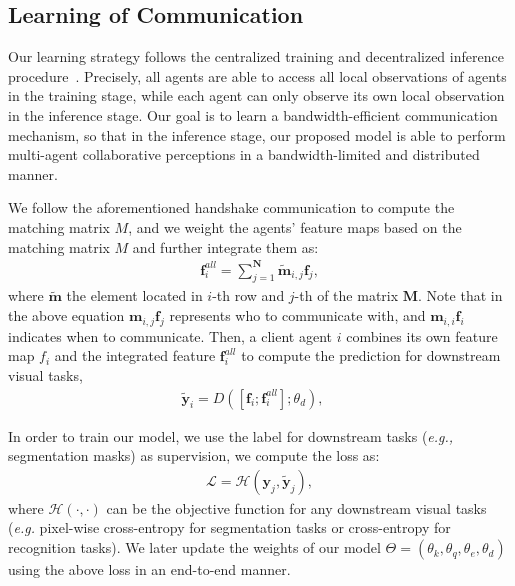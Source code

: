\subsection{Learning of Communication}
Our learning strategy follows the centralized training and decentralized inference procedure~\cite{lowe2017multi}. 
Precisely, all agents are able to access all local observations of agents in the training stage, while each agent can only observe its own local observation in the inference stage. Our goal is to learn a bandwidth-efficient communication mechanism, so that in the inference stage, our proposed model is able to perform multi-agent collaborative perceptions in a bandwidth-limited and distributed manner. 

We follow the aforementioned handshake communication to compute the matching matrix $M$, and we weight the agents' feature maps based on the matching matrix $M$ and further integrate them as: 
\begin{align}\label{eq:training_softmax}
        \bm{f}_{i}^{all} = \sum_{j=1}^{\bm{N}}\bm{\tilde{m}}_{i,j}\bm{f}_j,
\end{align}
where $\bm{\tilde{m}}$ the element located in
$i$-th row and $j$-th of the matrix $\bm{M}$. 
Note that in the above equation $\bm{m}_{i,j}\bm{f}_j$ represents who to communicate with, and $\bm{m}_{i,i}\bm{f}_i$ indicates when to communicate.
Then, a client agent $i$ combines its own feature map $f_i$ and the integrated feature $\bm{f}_{i}^{all}$ to compute the prediction for downstream visual tasks,
\begin{align}\label{eq:training_softmax}
        \bm{\tilde{y}}_i=D([{\bm{f}}_i; \bm{f}_{i}^{all}];\theta_d), \quad
\end{align}

In order to train our model, we use the label for downstream tasks (\textit{e.g.,} segmentation masks) as supervision, we compute the loss as:
\begin{align}\label{eq:loss}
\mathcal{L} = \mathcal{H}(\bm{y}_j, \bm{\tilde{y}}_j),
\end{align}
where $\mathcal{H}(\cdot,\cdot)$ can be the objective function for any downstream visual tasks (\textit{e.g.} pixel-wise cross-entropy for segmentation tasks or cross-entropy for recognition tasks). We later update the weights of our model $\Theta=(\theta_k,\theta_q, \theta_e, \theta_d)$ using the above loss in an end-to-end manner. 
